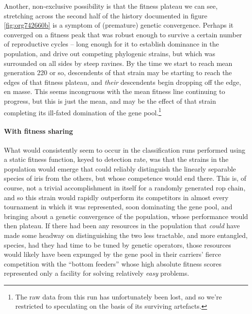 \documentclass[12pt,glossary]{dalthesis}
\begin{document}
Another, non-exclusive possibility is that the fitness plateau we can see,
stretching across the second half of the history documented in figure
\ref{fig:org742660b} is a symptom of (premature) genetic convergence. 
Perhaps it converged on a fitness peak that was robust enough to survive
a certain number of reproductive cycles -- long enough for it to establish
dominance in the population, and drive out competing phylogenic strains, but 
which was surrounded on all sides by steep ravines. By the time we start to reach
mean generation 220 or so, descendents of that strain may be starting to reach
the edges of that fitness plateau, and \emph{their} descendents begin dropping off the
edge, en masse. This seems incongruous with the mean fitness line continuing to
progress, but this is just the mean, and may be the effect of that strain completing
its ill-fated domination of the gene pool.\footnote{The raw data from this run has unfortunately been lost, and so we're restricted
  to speculating on the basis of its surviving artefacts.}

\paragraph{With fitness sharing}
\label{sec:orgc5365dc}
\label{org4b6107d}

 What would consistently seem to occur in the classification runs performed
 using a static fitness function, keyed to detection rate, was that the
 strains in the population would emerge that could reliably distinguish the
 linearly separable species of iris from the others, but whose competence
 would end there. This is, of course, not a trivial accomplishment in itself
 for a randomly generated \gls{rop} chain, and so this strain would rapidly
 outperform its competitors in almost every tournament in which it was
 represented, soon dominating the gene pool, and bringing about a genetic
 convergence of the population, whose performance would then plateau. If there
 had been any resources in the population that \emph{could} have made some headway
 on distinguishing the two less tractable, and more entangled, species, had
they had time to be tuned by genetic operators, those resources would likely
have been expunged by the gene pool in their carriers' fierce competition with
the ``bottom feeders'' whose high absolute fitness scores represented only a
facility for solving relatively \emph{easy} problems.
\end{document}
